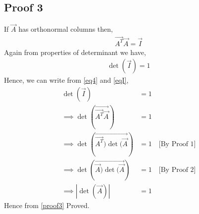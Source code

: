\documentclass[journal,12pt,twocolumn]{IEEEtran}
\begin{document}
\subsection{Proof 3}
If $\vec{A}$ has orthonormal columns then,
\begin{align}
\vec{A^T}\vec{A} = \vec{I}\label{eq4}
\end{align}
Again from properties of determinant we have,
\begin{align}
    \det(\vec{I}) = 1\label{eqI}
\end{align}
Hence, we can write from \eqref{eq4} and \eqref{eqI},
\begin{align}
\det(\vec{I}) &= 1\\
\implies\det(\vec{\vec{A^T}\vec{A}}) &= 1\\
\implies\det(\vec{\vec{A^T})\det(\vec{A}}) &= 1 \quad{\text{[By Proof 1]}}\\
\implies\det(\vec{\vec{A})\det(\vec{A}}) &= 1 \quad{\text{[By Proof 2]}}\\
\implies|\det(\vec{A})| &= 1\label{proof3}
\end{align}
Hence from \eqref{proof3} Proved.
\end{document}
